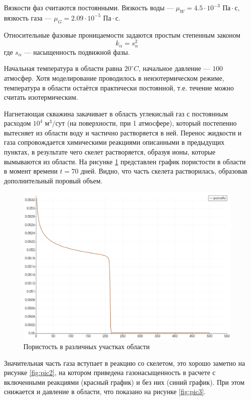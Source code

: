 \documentclass[14pt,a4paper]{extarticle}
\begin{document}
Вязкости фаз считаются постоянными. Вязкость воды --- ${\mu}_W = 4.5 \cdot 10^{-3} \text{ Па} \cdot \text{с}$, вязкость газа --- $\mu_G = 2.09\cdot 10^{-5} \text{ Па} \cdot \text{с}$.

Относительные фазовые проницаемости задаются простым степенным законом $$k_{\alpha} = s_{\alpha}^2$$ где $s_{\alpha}$ --- насыщенность подвижной фазы.

Начальная температура в области равна $20^\circ C$, начальное давление --- $100$ атмосфер. Хотя моделирование проводилось в неизотермическом режиме, температура в области остаётся практически постоянной, т.е. течение можно считать изотермическим.

Нагнетающая скважина закачивает в область углекислый газ с постоянным расходом $10^4 \text{ м}^3/\text{сут}$ (на поверхности, при 1 атмосфере), который постепенно вытесняет из области воду и частично растворяется в ней. Перенос жидкости и газа сопровождается химическими реакциями описанными в предыдущих пунктах, в результате чего скелет растворяется, образуя ионы, которые вымываются из области. На рисунке \ref{fig:pic1} представлен график пористости в области в момент времени $t = 70\text{ дней}$. Видно, что часть скелета растворилась, образовав дополнительный поровый объем.

\begin{figure}[h!]
\centering
\includegraphics[width=.75\textwidth]{porosity}
\caption{Пористость в различных участках области} \label{fig:pic1}
\end{figure}

Значительная часть газа вступает в реакцию со скелетом, это хорошо заметно на рисунке \ref{fig:pic2}, на котором приведена газонасыщенность в расчете с включенными реакциями (красный график) и без них (синий график).
При этом снижается и давление в области, что показано на рисунке \ref{fig:pic3}.
\end{document}
